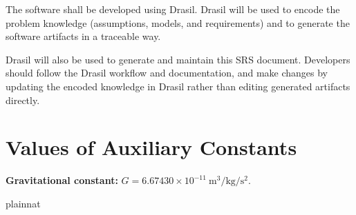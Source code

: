 \documentclass[12pt]{article}
\begin{document}
The software shall be developed using Drasil. Drasil will be used to encode the
problem knowledge (assumptions, models, and requirements) and to generate the
software artifacts in a traceable way.

Drasil will also be used to generate and maintain this SRS document. Developers
should follow the Drasil workflow and documentation, and make changes by
updating the encoded knowledge in Drasil rather than editing generated artifacts
directly.


\section{Values of Auxiliary Constants}

\noindent \textbf{Gravitational constant:}
$G = 6.67430\times 10^{-11}\ \si{\metre^3\per\kilogram\per\second^2}$.




\newpage

 {plainnat}

\end{document}
